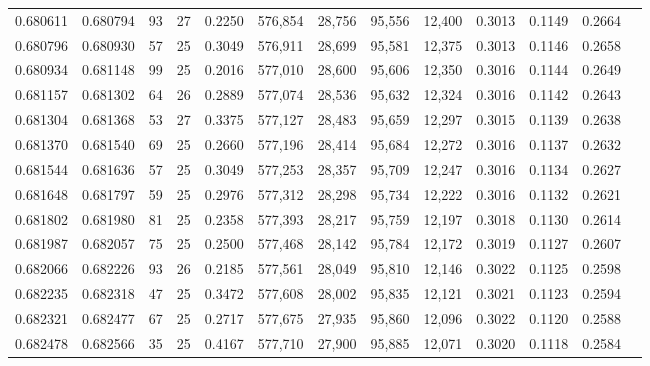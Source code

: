 \begin{tabular}{rrrrrrrrrrrrr}
0.680611 & 0.680794 &  93 &  27 &                                     0.2250 & 576,854 &  28,756 &  95,556 &  12,400 & 0.3013 & 0.1149 & 0.2664 \\
0.680796 & 0.680930 &  57 &  25 &                                     0.3049 & 576,911 &  28,699 &  95,581 &  12,375 & 0.3013 & 0.1146 & 0.2658 \\
0.680934 & 0.681148 &  99 &  25 &                                     0.2016 & 577,010 &  28,600 &  95,606 &  12,350 & 0.3016 & 0.1144 & 0.2649 \\
0.681157 & 0.681302 &  64 &  26 &                                     0.2889 & 577,074 &  28,536 &  95,632 &  12,324 & 0.3016 & 0.1142 & 0.2643 \\
0.681304 & 0.681368 &  53 &  27 &                                     0.3375 & 577,127 &  28,483 &  95,659 &  12,297 & 0.3015 & 0.1139 & 0.2638 \\
0.681370 & 0.681540 &  69 &  25 &                                     0.2660 & 577,196 &  28,414 &  95,684 &  12,272 & 0.3016 & 0.1137 & 0.2632 \\
0.681544 & 0.681636 &  57 &  25 &                                     0.3049 & 577,253 &  28,357 &  95,709 &  12,247 & 0.3016 & 0.1134 & 0.2627 \\
0.681648 & 0.681797 &  59 &  25 &                                     0.2976 & 577,312 &  28,298 &  95,734 &  12,222 & 0.3016 & 0.1132 & 0.2621 \\
0.681802 & 0.681980 &  81 &  25 &                                     0.2358 & 577,393 &  28,217 &  95,759 &  12,197 & 0.3018 & 0.1130 & 0.2614 \\
0.681987 & 0.682057 &  75 &  25 &                                     0.2500 & 577,468 &  28,142 &  95,784 &  12,172 & 0.3019 & 0.1127 & 0.2607 \\
0.682066 & 0.682226 &  93 &  26 &                                     0.2185 & 577,561 &  28,049 &  95,810 &  12,146 & 0.3022 & 0.1125 & 0.2598 \\
0.682235 & 0.682318 &  47 &  25 &                                     0.3472 & 577,608 &  28,002 &  95,835 &  12,121 & 0.3021 & 0.1123 & 0.2594 \\
0.682321 & 0.682477 &  67 &  25 &                                     0.2717 & 577,675 &  27,935 &  95,860 &  12,096 & 0.3022 & 0.1120 & 0.2588 \\
0.682478 & 0.682566 &  35 &  25 &                                     0.4167 & 577,710 &  27,900 &  95,885 &  12,071 & 0.3020 & 0.1118 & 0.2584 \\

\end{tabular}
